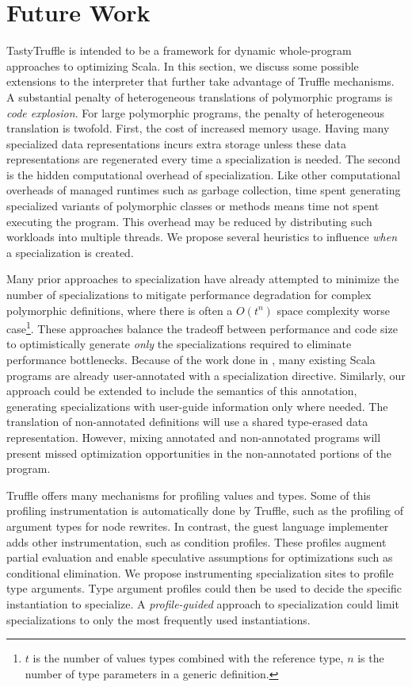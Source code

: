 \chapter{Future Work}

TastyTruffle is intended to be a framework for dynamic whole-program approaches to optimizing Scala.
In this section, we discuss some possible extensions to the interpreter that further take advantage of Truffle mechanisms.
A substantial penalty of heterogeneous translations of polymorphic programs is \textit{code explosion}.
For large polymorphic programs, the penalty of heterogeneous translation is twofold.
First, the cost of increased memory usage.
Having many specialized data representations incurs extra storage unless these data representations are regenerated every time a specialization is needed.
The second is the hidden computational overhead of specialization. 
Like other computational overheads of managed runtimes such as garbage collection, time spent generating specialized variants of polymorphic classes or methods means time not spent executing the program.
This overhead may be reduced by distributing such workloads into multiple threads.
We propose several heuristics to influence \textit{when} a specialization is created.

Many prior approaches to specialization have already attempted to minimize the number of specializations to mitigate performance degradation for complex polymorphic definitions, where there is often a \(O(t^n)\) space complexity worse case\footnote{$t$ is the number of values types combined with the reference type, $n$ is the number of type parameters in a generic definition.}.
These approaches balance the tradeoff between performance and code size to optimistically generate \textit{only} the specializations required to eliminate performance bottlenecks.
Because of the work done in \cite{scala:specialization}, many existing Scala programs are already user-annotated with a specialization directive.
Similarly, our approach could be extended to include the semantics of this annotation, generating specializations with user-guide information only where needed.
The translation of non-annotated definitions will use a shared type-erased data representation.
However, mixing annotated and non-annotated programs will present missed optimization opportunities in the non-annotated portions of the program.

Truffle offers many mechanisms for profiling values and types.
Some of this profiling instrumentation is automatically done by Truffle, such as the profiling of argument types for node rewrites. In contrast, the guest language implementer adds other instrumentation,  such as condition profiles.
These profiles augment partial evaluation and enable speculative assumptions for optimizations such as conditional elimination.
We propose instrumenting specialization sites to profile type arguments.
Type argument profiles could then be used to decide the specific instantiation to specialize.
A \textit{profile-guided} approach to specialization could limit specializations to only the most frequently used instantiations.

